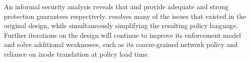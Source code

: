 An informal security analysis reveals that \bpfbox{} and \bpfcontain{} provide adequate and
strong protection guarantees respectively. \bpfcontain{} resolves many of the issues that
existed in the original \bpfbox{} design, while simultaneously simplifying the resulting
policy language. Further iterations on the \bpfcontain{} design will continue to improve
its enforcement model and solve additional weaknesses, such as its coarse-grained network
policy and reliance on inode translation at policy load time.
